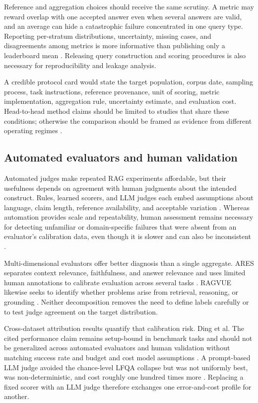 \documentclass[a4paper,11pt]{article}
\begin{document}
Reference and aggregation choices should receive the same scrutiny. A metric may reward overlap with one accepted answer even when several answers are valid, and an average can hide a catastrophic failure concentrated in one query type. Reporting per-stratum distributions, uncertainty, missing cases, and disagreements among metrics is more informative than publishing only a leaderboard mean \citep{Ding2026Attribution,Zhang2026Before}. Releasing query construction and scoring procedures is also necessary for reproducibility and leakage analysis.

A credible protocol card would state the target population, corpus date, sampling process, task instructions, reference provenance, unit of scoring, metric implementation, aggregation rule, uncertainty estimate, and evaluation cost. Head-to-head method claims should be limited to studies that share these conditions; otherwise the comparison should be framed as evidence from different operating regimes \citep{Li2026Mrag,SaadFalcon2023Ares,Yao2026Authoritybench}.
\subsection{Automated evaluators and human validation}


Automated judges make repeated RAG experiments affordable, but their usefulness depends on agreement with human judgments about the intended construct. Rules, learned scorers, and LLM judges each embed assumptions about language, claim length, reference availability, and acceptable variation \citep{SaadFalcon2023Ares,Ding2026Attribution}. Whereas automation provides scale and repeatability, human assessment remains necessary for detecting unfamiliar or domain-specific failures that were absent from an evaluator's calibration data, even though it is slower and can also be inconsistent \citep{Caruzzo2026Deceptive,Brehme2025Retrieval}.

Multi-dimensional evaluators offer better diagnosis than a single aggregate. ARES separates context relevance, faithfulness, and answer relevance and uses limited human annotations to calibrate evaluation across several tasks \citep{SaadFalcon2023Ares}. RAGVUE likewise seeks to identify whether problems arise from retrieval, reasoning, or grounding \citep{Murugaraj2025Ragvue}. Neither decomposition removes the need to define labels carefully or to test judge agreement on the target distribution.

Cross-dataset attribution results quantify that calibration risk. Ding et al. The cited performance claim remains setup-bound in benchmark tasks and should not be generalized across automated evaluators and human validation without matching success rate and budget and cost model assumptions \citep{Ding2026Attribution}. A prompt-based LLM judge avoided the chance-level LFQA collapse but was not uniformly best, was non-deterministic, and cost roughly one hundred times more \citep{Ding2026Attribution}. Replacing a fixed scorer with an LLM judge therefore exchanges one error-and-cost profile for another.
\end{document}

